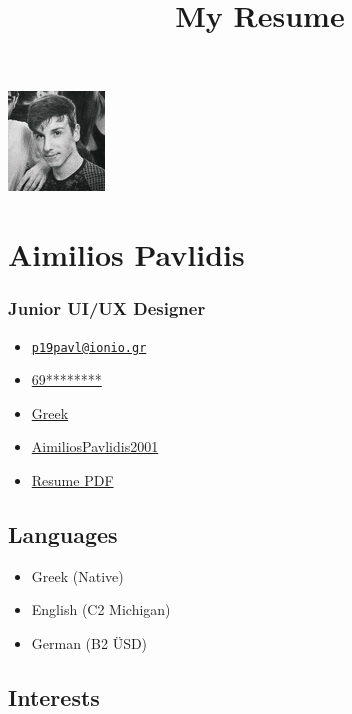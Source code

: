 \documentclass[english,]{article}
\title{My Resume}
\date{}
\providecommand{\tightlist}{%
  \setlength{\itemsep}{0pt}\setlength{\parskip}{0pt}}
\begin{document}
\maketitle

\includegraphics{aimilios-prof-1-1.jpg}

\hypertarget{aimilios-pavlidis}{%
\section{Aimilios Pavlidis}\label{aimilios-pavlidis}}

\hypertarget{junior-uiux-designer}{%
\subsubsection{Junior UI/UX Designer}\label{junior-uiux-designer}}

\begin{itemize}
\tightlist
\item
  \emph{} \href{mailto:p19pavl@ionio.gr}{\nolinkurl{p19pavl@ionio.gr}}
\item
  \emph{} \href{tel:69********}{69********}
\item
  \emph{} \href{}{Greek}
\item
  \emph{}
  \href{http://github.com/AimiliosPavlidis2001}{AimiliosPavlidis2001}
\item
  \emph{} \href{http://www.africau.edu/images/default/sample.pdf}{Resume
  PDF}
\end{itemize}

\hypertarget{languages}{%
\subsection{Languages}\label{languages}}

\begin{itemize}
\tightlist
\item
  Greek {(Native)}
\item
  English {(C2 Michigan)}
\item
  German {(B2 ÜSD)}
\end{itemize}

\hypertarget{interests}{%
\subsection{Interests}\label{interests}}
\end{document}
